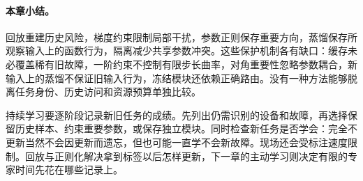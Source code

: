 \paragraph{本章小结。}
回放重建历史风险，梯度约束限制局部干扰，参数正则保存重要方向，蒸馏保存所观察输入上的函数行为，隔离减少共享参数冲突。这些保护机制各有缺口：缓存未必覆盖稀有旧故障，一阶约束不控制有限步长曲率，对角重要性忽略参数耦合，新输入上的蒸馏不保证旧输入行为，冻结模块还依赖正确路由。没有一种方法能够脱离任务身份、历史访问和资源预算单独比较。

持续学习要逐阶段记录新旧任务的成绩。先列出仍需识别的设备和故障，再选择保留历史样本、约束重要参数，或保存独立模块。同时检查新任务是否学会：完全不更新当然不会因更新而遗忘，但也可能一直学不会新故障。现场还会受标注速度限制。回放与正则化解决拿到标签以后怎样更新，下一章的主动学习则决定有限的专家时间先花在哪些记录上。
